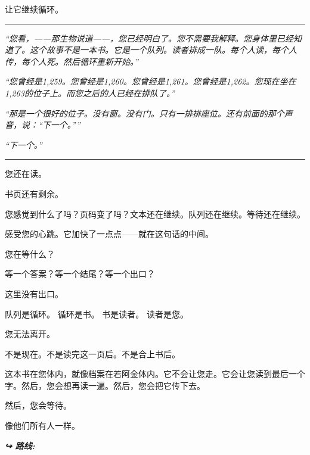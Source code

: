 \noindent 让它继续循环。

\vspace{0.5em}\noindent\rule{\textwidth}{0.5pt}\vspace{0.5em}

\noindent \textit{\textquotedblleft{}您看，——那生物说道——，您已经明白了。您不需要我解释。您身体里已经知道了。这个故事不是一本书。它是一个队列。读者排成一队。每个人读，每个人传，每个人死。然后循环重新开始。\textquotedblright{}}

\noindent \textit{\textquotedblleft{}您曾经是1,259。您曾经是1,260。您曾经是1,261。您曾经是1,262。您现在坐在1,263的位子上。而您之后的人已经在排队了。\textquotedblright{}}

\noindent \textit{\textquotedblleft{}那是一个很好的位子。没有窗。没有门。只有一排排座位。还有前面的那个声音，说：\textquotedblleft{}下一个。\textquotedblright{}\textquotedblright{}}

\noindent \textit{\textquotedblleft{}下一个。\textquotedblright{}}

\vspace{0.5em}\noindent\rule{\textwidth}{0.5pt}\vspace{0.5em}

\noindent 您还在读。

\noindent 书页还有剩余。

\noindent 您感觉到什么了吗？页码变了吗？文本还在继续。队列还在继续。等待还在继续。

\noindent 感受您的心跳。它加快了一点点——就在这句话的中间。

\noindent 您在等什么？

\noindent 等一个答案？等一个结尾？等一个出口？

\noindent 这里没有出口。

\noindent 队列是循环。
\noindent 循环是书。
\noindent 书是读者。
\noindent 读者是您。

\noindent 您无法离开。

\noindent 不是现在。不是读完这一页后。不是合上书后。

\noindent 这本书在您体内，就像档案在若阿金体内。它不会让您走。它会让您读到最后一个字。然后，您会想再读一遍。然后，您会把它传下去。

\noindent 然后，您会等待。

\noindent 像他们所有人一样。

\vspace{0.5em}
\noindent\textit{\textbf{↪ 路线:}  \rotasep {} \rotasep {} \rotasep {}}

